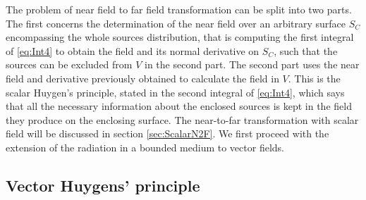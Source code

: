 \par The problem of near field to far field transformation can be split into two parts. The first concerns the determination of the near field over an arbitrary surface $S_C$ encompassing the whole sources distribution, that is computing the first integral of \eqref{eq:Int4} to obtain the field and its normal derivative on $S_C$, such that the sources can be excluded from $V$ in the second part. The second part uses the near field and derivative previously obtained to calculate the field in $V$. This is the scalar Huygen's principle, stated in the second integral of \eqref{eq:Int4}, which says that all the necessary information about the enclosed sources is kept in the field they produce on the enclosing surface. The near-to-far transformation with scalar field will be discussed in section \ref{sec:ScalarN2F}. We first proceed with the extension of the radiation in a bounded medium to vector fields.

\subsection{Vector Huygens' principle} \label{sec:VectorHuygens} %

